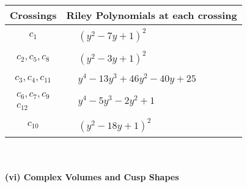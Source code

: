\documentclass[1p]{elsarticle_modified}
\theoremstyle{definition}
\begin{document}
\begin{tabular}{m{50pt}|m{274pt}}
Crossings & \hspace{64pt}Riley Polynomials at each crossing \\
\hline $$\begin{aligned}c_{1}\end{aligned}$$&$\begin{aligned}
&(y^2-7 y+1)^2
\end{aligned}$\\
\hline $$\begin{aligned}c_{2},c_{5},c_{8}\end{aligned}$$&$\begin{aligned}
&(y^2-3 y+1)^2
\end{aligned}$\\
\hline $$\begin{aligned}c_{3},c_{4},c_{11}\end{aligned}$$&$\begin{aligned}
&y^4-13 y^3+46 y^2-40 y+25
\end{aligned}$\\
\hline $$\begin{aligned}c_{6},c_{7},c_{9}\\c_{12}\end{aligned}$$&$\begin{aligned}
&y^4-5 y^3-2 y^2+1
\end{aligned}$\\
\hline $$\begin{aligned}c_{10}\end{aligned}$$&$\begin{aligned}
&(y^2-18 y+1)^2
\end{aligned}$\\
\hline
\end{tabular}\\~\\
\newpage\flushleft \textbf{(vi) Complex Volumes and Cusp Shapes}
\end{document}
